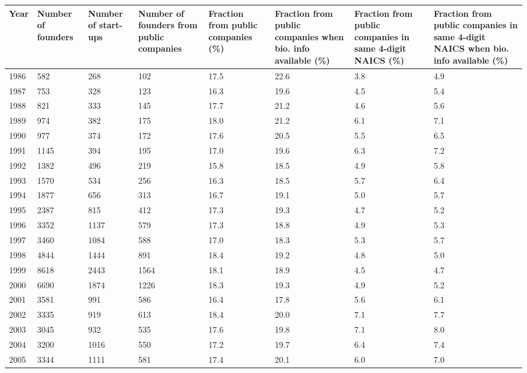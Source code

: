 \begin{table}[!htb]
\centering
\begingroup\scriptsize
\begin{tabular}{p{1.75cm}p{1.75cm}p{1.75cm}p{1.75cm}p{1.75cm}p{1.75cm}p{1.75cm}p{1.75cm}}
  \toprule
Year & Number of founders & Number of start-ups & Number of founders from public companies & Fraction from public companies (\%) & Fraction from public companies when bio. info available (\%) & Fraction from public companies in same 4-digit NAICS (\%) & Fraction from public companies in same 4-digit NAICS when bio. info available (\%) \\ 
  \midrule
1986 & 582 & 268 & 102 & 17.5 & 22.6 & 3.8 & 4.9 \\ 
  1987 & 753 & 328 & 123 & 16.3 & 19.6 & 4.5 & 5.4 \\ 
  1988 & 821 & 333 & 145 & 17.7 & 21.2 & 4.6 & 5.6 \\ 
  1989 & 974 & 382 & 175 & 18.0 & 21.2 & 6.1 & 7.1 \\ 
  1990 & 977 & 374 & 172 & 17.6 & 20.5 & 5.5 & 6.5 \\ 
  1991 & 1145 & 394 & 195 & 17.0 & 19.6 & 6.3 & 7.2 \\ 
  1992 & 1382 & 496 & 219 & 15.8 & 18.5 & 4.9 & 5.8 \\ 
  1993 & 1570 & 534 & 256 & 16.3 & 18.5 & 5.7 & 6.4 \\ 
  1994 & 1877 & 656 & 313 & 16.7 & 19.1 & 5.0 & 5.7 \\ 
  1995 & 2387 & 815 & 412 & 17.3 & 19.3 & 4.7 & 5.2 \\ 
  1996 & 3352 & 1137 & 579 & 17.3 & 18.8 & 4.9 & 5.3 \\ 
  1997 & 3460 & 1084 & 588 & 17.0 & 18.3 & 5.3 & 5.7 \\ 
  1998 & 4844 & 1444 & 891 & 18.4 & 19.2 & 4.8 & 5.0 \\ 
  1999 & 8618 & 2443 & 1564 & 18.1 & 18.9 & 4.5 & 4.7 \\ 
  2000 & 6690 & 1874 & 1226 & 18.3 & 19.3 & 4.9 & 5.2 \\ 
  2001 & 3581 & 991 & 586 & 16.4 & 17.8 & 5.6 & 6.1 \\ 
  2002 & 3335 & 919 & 613 & 18.4 & 20.0 & 7.1 & 7.7 \\ 
  2003 & 3045 & 932 & 535 & 17.6 & 19.8 & 7.1 & 8.0 \\ 
  2004 & 3200 & 1016 & 550 & 17.2 & 19.7 & 6.4 & 7.4 \\ 
  2005 & 3344 & 1111 & 581 & 17.4 & 20.1 & 6.0 & 7.0 \\ 

\end{tabular}
\end{table}
